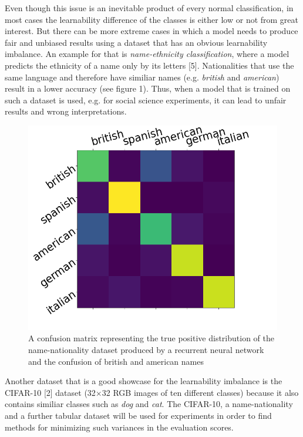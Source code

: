 \documentclass[journal]{IEEEtran}
\begin{document}
Even though this issue is an inevitable product of every normal classification, in most cases the learnability difference of the classes is either low or not from great interest.
But there can be more extreme cases in which a model needs to produce fair and unbiased results using a dataset that has an obvious learnability imbalance. 
An example for that is \emph{name-ethnicity classification}, where a model predicts the ethnicity of a name only by its letters [5]. 
Nationalities that use the same language and therefore have similiar names (e.g. \emph{british} and \emph{american}) result in a lower accuracy (see figure 1).
Thus, when a model that is trained on such a dataset is used, e.g. for social science experiments, it can lead to unfair results and wrong interpretations. 

\begin{figure}[h!]
        \includegraphics[width=\linewidth]{images/Figure_1.png}
        \caption{A confusion matrix representing the true positive distribution of the name-nationality dataset produced by a recurrent neural network and the confusion of british and american names}
        \label{fig:tp_scores}
\end{figure}

Another dataset that is a good showcase for the learnability imbalance is the CIFAR-10 [2] dataset (32$\times$32 RGB images of ten different classes) because it also contains similiar classes such as \emph{dog} and \emph{cat}.
The CIFAR-10, a name-nationality and a further tabular dataset will be used for experiments in order to find methods for minimizing such variances in the evaluation scores.
\end{document}
